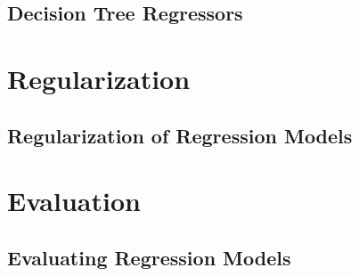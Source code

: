 \documentclass[12pt letter]{report}
\begin{document}
\section{Decision Tree Regressors}

\chapter{Regularization}
\section{Regularization of Regression Models}

\chapter{Evaluation}
\section{Evaluating Regression Models}
\end{document}
